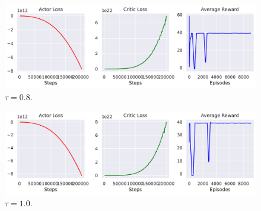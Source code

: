 \begin{figure}[ht]
  \centering
  \includegraphics[width=\linewidth]{images/exp-hopper-tau0.8.pdf}
  \caption{$\tau = 0.8$.}
\end{figure}

\begin{figure}[ht]
  \centering
  \includegraphics[width=\linewidth]{images/exp-hopper-tau1.pdf}
  \caption{$\tau = 1.0$.}
\end{figure}

